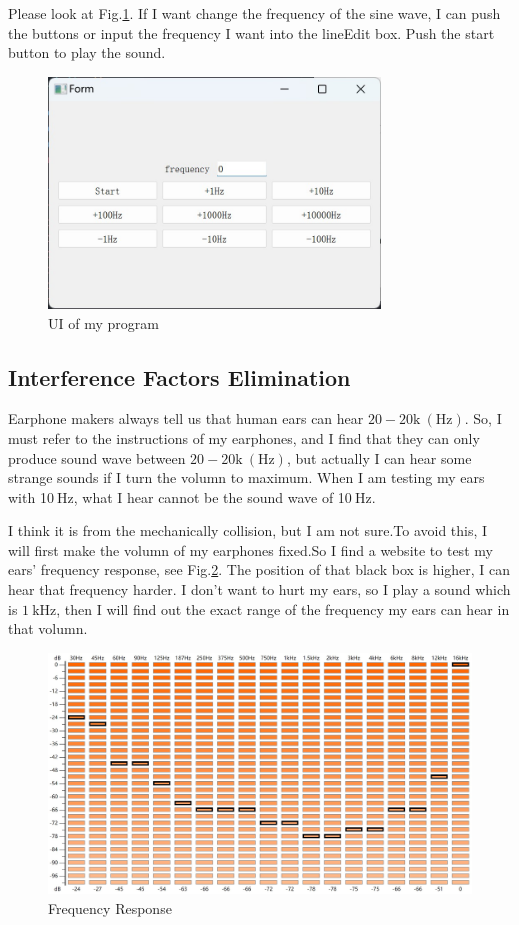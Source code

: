 \documentclass{article}
\begin{document}
Please look at Fig.\ref{UI}. If I want change the frequency of the sine wave, I can push the buttons or input the frequency I want into the lineEdit box. Push the start button to play the sound.

\begin{figure}[htbp]
    \centering
    \includegraphics[keepaspectratio,width=250pt]{FreqWindow.jpg}
    \caption{UI of my program}\label{UI}
\end{figure}

\subsection{Interference Factors Elimination}
Earphone makers always tell us that human ears can hear $20-20\mathrm{k}~\mathrm{(Hz)}$. So, I must refer to the instructions of my earphones, and I find that they can only produce sound wave between $20-20\mathrm{k}~\mathrm{(Hz)}$, but actually I can hear some strange sounds if I turn the volumn to maximum. When I am testing my ears with 10$~\mathrm{Hz}$, what I hear cannot be the sound wave of 10$~\mathrm{Hz}$. 

I think it is from the mechanically collision, but I am not sure.To avoid this, I will first make the volumn of my earphones fixed.So I find a website\cite{HearingTest} to test my ears' frequency response, see Fig.\ref{FR}. The position of that black box is higher, I can hear that frequency harder. I don't want to hurt my ears, so I play a sound which is $1\mathrm{~kHz}$, then I will find out the exact range of the frequency my ears can hear in that volumn.

\begin{figure}[htbp]
    \centering
    \includegraphics[keepaspectratio,width=400pt]{freqReaction.jpg}
    \caption{Frequency Response}
    \label{FR}
\end{figure}
\end{document}
